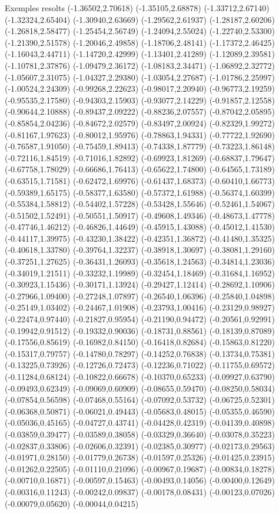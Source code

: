 \documentclass[11pt,a4paper]{article}
\begin{document}
\begin{fmex}{Exemples resolts}
(-1.36502,2.70618) (-1.35105,2.68878) (-1.33712,2.67140) (-1.32324,2.65404) (-1.30940,2.63669) (-1.29562,2.61937) (-1.28187,2.60206) (-1.26818,2.58477) (-1.25454,2.56749) (-1.24094,2.55024) (-1.22740,2.53300) (-1.21390,2.51578) (-1.20046,2.49858) (-1.18706,2.48141) (-1.17372,2.46425) (-1.16043,2.44711) (-1.14720,2.42999) (-1.13401,2.41289) (-1.12089,2.39581) (-1.10781,2.37876) (-1.09479,2.36172) (-1.08183,2.34471) (-1.06892,2.32772) (-1.05607,2.31075) (-1.04327,2.29380) (-1.03054,2.27687) (-1.01786,2.25997) (-1.00524,2.24309) (-0.99268,2.22623) (-0.98017,2.20940) (-0.96773,2.19259) (-0.95535,2.17580) (-0.94303,2.15903) (-0.93077,2.14229) (-0.91857,2.12558) (-0.90644,2.10888) (-0.89437,2.09222) (-0.88236,2.07557) (-0.87042,2.05895) (-0.85854,2.04236) (-0.84672,2.02579) (-0.83497,2.00924) (-0.82329,1.99272) (-0.81167,1.97623) (-0.80012,1.95976) (-0.78863,1.94331) (-0.77722,1.92690) (-0.76587,1.91050) (-0.75459,1.89413) (-0.74338,1.87779) (-0.73223,1.86148) (-0.72116,1.84519) (-0.71016,1.82892) (-0.69923,1.81269) (-0.68837,1.79647) (-0.67758,1.78029) (-0.66686,1.76413) (-0.65622,1.74800) (-0.64565,1.73189) (-0.63515,1.71581) (-0.62472,1.69976) (-0.61437,1.68373) (-0.60410,1.66773) (-0.59389,1.65175) (-0.58377,1.63580) (-0.57372,1.61988) (-0.56374,1.60399) (-0.55384,1.58812) (-0.54402,1.57228) (-0.53428,1.55646) (-0.52461,1.54067) (-0.51502,1.52491) (-0.50551,1.50917) (-0.49608,1.49346) (-0.48673,1.47778) (-0.47746,1.46212) (-0.46826,1.44649) (-0.45915,1.43088) (-0.45012,1.41530) (-0.44117,1.39975) (-0.43230,1.38422) (-0.42351,1.36872) (-0.41480,1.35325) (-0.40618,1.33780) (-0.39764,1.32237) (-0.38918,1.30697) (-0.38081,1.29160) (-0.37251,1.27625) (-0.36431,1.26093) (-0.35618,1.24563) (-0.34814,1.23036) (-0.34019,1.21511) (-0.33232,1.19989) (-0.32454,1.18469) (-0.31684,1.16952) (-0.30923,1.15436) (-0.30171,1.13924) (-0.29427,1.12414) (-0.28692,1.10906) (-0.27966,1.09400) (-0.27248,1.07897) (-0.26540,1.06396) (-0.25840,1.04898) (-0.25149,1.03402) (-0.24467,1.01908) (-0.23793,1.00416) (-0.23129,0.98927) (-0.22474,0.97440) (-0.21827,0.95954) (-0.21190,0.94472) (-0.20561,0.92991) (-0.19942,0.91512) (-0.19332,0.90036) (-0.18731,0.88561) (-0.18139,0.87089) (-0.17556,0.85619) (-0.16982,0.84150) (-0.16418,0.82684) (-0.15863,0.81220) (-0.15317,0.79757) (-0.14780,0.78297) (-0.14252,0.76838) (-0.13734,0.75381) (-0.13225,0.73926) (-0.12726,0.72473) (-0.12236,0.71022) (-0.11755,0.69572) (-0.11284,0.68124) (-0.10822,0.66678) (-0.10370,0.65233) (-0.09927,0.63790) (-0.09493,0.62349) (-0.09069,0.60909) (-0.08655,0.59470) (-0.08250,0.58034) (-0.07854,0.56598) (-0.07468,0.55164) (-0.07092,0.53732) (-0.06725,0.52301) (-0.06368,0.50871) (-0.06021,0.49443) (-0.05683,0.48015) (-0.05355,0.46590) (-0.05036,0.45165) (-0.04727,0.43741) (-0.04428,0.42319) (-0.04139,0.40898) (-0.03859,0.39477) (-0.03589,0.38058) (-0.03329,0.36640) (-0.03078,0.35223) (-0.02837,0.33806) (-0.02606,0.32391) (-0.02385,0.30977) (-0.02173,0.29563) (-0.01971,0.28150) (-0.01779,0.26738) (-0.01597,0.25326) (-0.01425,0.23915) (-0.01262,0.22505) (-0.01110,0.21096) (-0.00967,0.19687) (-0.00834,0.18278) (-0.00710,0.16871) (-0.00597,0.15463) (-0.00493,0.14056) (-0.00400,0.12649) (-0.00316,0.11243) (-0.00242,0.09837) (-0.00178,0.08431) (-0.00123,0.07026) (-0.00079,0.05620) (-0.00044,0.04215) 
\end{fmex}
\end{document}
